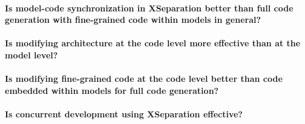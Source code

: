 \paragraph{Is model-code synchronization in XSeparation better than full code generation with fine-grained code within models in general?}

\paragraph{Is modifying architecture at the code level more effective than at the model level?}

\paragraph{Is modifying fine-grained code at the code level better than code embedded within models for full code generation?}

\paragraph{Is concurrent development using XSeparation effective?}

